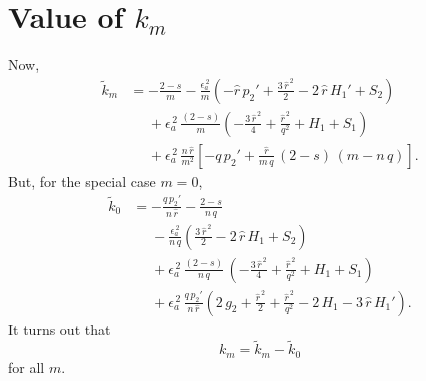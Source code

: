 \documentclass[12pt,prb,aps,notitlepage]{revtex4-1}
\begin{document}
\section{Value of $k_m$}
Now, 
\begin{align}
\tilde{k}_m&= -\frac{2-s}{m}
-\frac{\epsilon_a^{\,2}}{m}\left(-\hat{r}\,p_2'+
\frac{3\,\hat{r}^{\,2}}{2}-2\,\hat{r}\,H_1' +S_2\right)\nonumber\\[0.5ex]
&\phantom{=}
+\epsilon_a^{\,2}\,\frac{(2-s)}{m}\left(-\frac{3\,\hat{r}^{\,2}}{4} +\frac{\hat{r}^{\,2}}{q^2}+H_1+S_1\right)\nonumber\\[0.5ex]
&\phantom{=}
+\epsilon_a^{\,2}\,\frac{n\,\hat{r}}{m^2}\left[-q\,p_2' + \frac{\hat{r}}{m\,q}\,(2-s)\,(m-n\,q)\right].
\end{align}
But, for the special case $m=0$, 
\begin{align}
\tilde{k}_0 &= - \frac{q\,p_2'}{n\,\hat{r}} - \frac{2-s}{n\,q} 
\nonumber\\[0.5ex]
&\phantom{=}-\frac{\epsilon_a^{\,2}}{n\,q}\left(
\frac{3\,\hat{r}^{\,2}}{2}-2\,\hat{r}\,H_1+S_2\right)\nonumber\\[0.5ex]
&\phantom{=}
+\epsilon_a^{\,2}\,\frac{(2-s)}{n\,q}\,\left(-\frac{3\,\hat{r}^{\,2}}{4} +\frac{\hat{r}^{\,2}}{q^2}+H_1 +S_1\right)\nonumber\\[0.5ex]
&\phantom{=}
+\epsilon_a^{\,2}\,\frac{q\,p_2'}{n\,\hat{r}}\left(2\,g_2+\frac{\hat{r}^{\,2}}{2}+\frac{\hat{r}^{\,2}}{q^2}-2\,H_1-3\,\hat{r}\,H_1'\right).
\end{align}
It turns out that
\begin{equation}
k_m = \tilde{k}_m - \tilde{k}_0
\end{equation}
for all $m$. 
\end{document}
